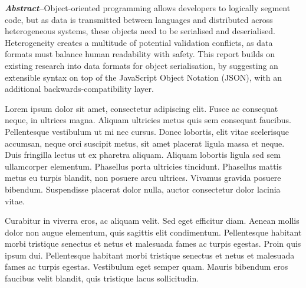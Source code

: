\documentclass[../report.tex]{subfiles}
\begin{document}
{\textbf{\textit{Abstract--}}Object-oriented programming allows developers to logically segment code, but as data is transmitted between languages and distributed across heterogeneous systems, these objects need to be serialised and deserialised. Heterogeneity creates a multitude of potential validation conflicts, as data formats must balance human readability with safety. This report builds on existing research into data formats for object serialisation, by suggesting an extensible syntax on top of the JavaScript Object Notation (JSON), with an additional backwards-compatibility layer.}

\color{red}
Lorem ipsum dolor sit amet, consectetur adipiscing elit. Fusce ac consequat neque, in ultrices magna. Aliquam ultricies metus quis sem consequat faucibus. Pellentesque vestibulum ut mi nec cursus. Donec lobortis, elit vitae scelerisque accumsan, neque orci suscipit metus, sit amet placerat ligula massa et neque. Duis fringilla lectus ut ex pharetra aliquam. Aliquam lobortis ligula sed sem ullamcorper elementum. Phasellus porta ultricies tincidunt. Phasellus mattis metus eu turpis blandit, non posuere arcu ultrices. Vivamus gravida posuere bibendum. Suspendisse placerat dolor nulla, auctor consectetur dolor lacinia vitae.

Curabitur in viverra eros, ac aliquam velit. Sed eget efficitur diam. Aenean mollis dolor non augue elementum, quis sagittis elit condimentum. Pellentesque habitant morbi tristique senectus et netus et malesuada fames ac turpis egestas. Proin quis ipsum dui. Pellentesque habitant morbi tristique senectus et netus et malesuada fames ac turpis egestas. Vestibulum eget semper quam. Mauris bibendum eros faucibus velit blandit, quis tristique lacus sollicitudin. \\
\color{black}
\end{document}

